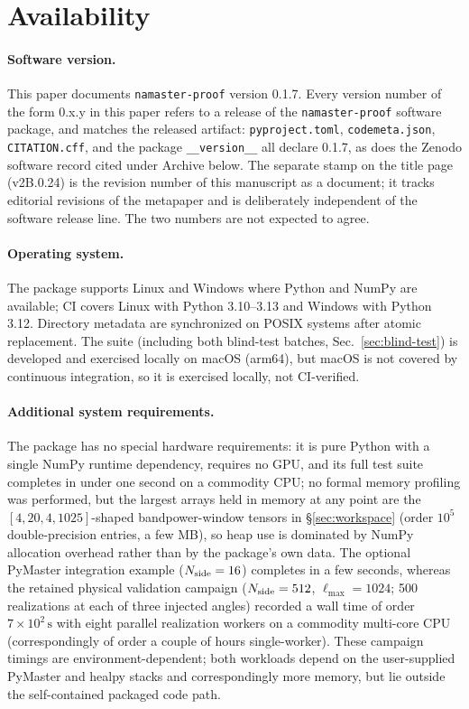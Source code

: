 \documentclass[11pt]{article}
\newcommand{\software}{\texttt{namaster-proof}}
\newcommand{\paperVersion}{v2B.0.24}
\begin{document}
\section{Availability}
\label{sec:availability}

\paragraph{Software version.}
This paper documents \software{} version 0.1.7. Every version number of the
form 0.x.y in this paper refers to a release of the \software{} software
package, and matches the released artifact: \texttt{pyproject.toml},
\texttt{codemeta.json}, \texttt{CITATION.cff}, and the package
\texttt{\_\_version\_\_} all declare 0.1.7, as does the Zenodo software record
cited under Archive below. The separate stamp on the title page
(\paperVersion) is the revision number of this manuscript as a document; it
tracks editorial revisions of the metapaper and is deliberately independent of
the software release line. The two numbers are not expected to agree.

\paragraph{Operating system.}
The package supports Linux and Windows where Python and NumPy are available;
CI covers Linux with Python 3.10--3.13 and Windows with Python 3.12. Directory
metadata are synchronized on POSIX systems after atomic replacement. The
suite (including both blind-test batches, Sec.~\ref{sec:blind-test}) is
developed and exercised locally on macOS (arm64), but macOS is not covered by
continuous integration, so it is exercised locally, not CI-verified.

\paragraph{Additional system requirements.}
The package has no special hardware requirements: it is pure Python with a
single NumPy runtime dependency, requires no GPU, and its full test suite
completes in under one second on a commodity CPU; no formal memory profiling
was performed, but the largest arrays held in memory at any point are the
\([4,20,4,1025]\)-shaped bandpower-window tensors in
\S\ref{sec:workspace} (order \(10^5\) double-precision entries, a few MB),
so heap use is dominated by NumPy allocation overhead rather than by the
package's own data. The optional PyMaster integration example (\(N_{\rm side}=16\)) completes
in a few seconds, whereas the retained physical validation campaign
(\(N_{\rm side}=512\), \(\ell_{\max}=1024\); 500 realizations at each of three
injected angles) recorded a wall time of order \(7\times10^{2}\,\mathrm{s}\)
with eight parallel realization workers on a commodity multi-core CPU
(correspondingly of order a couple of hours single-worker). These campaign
timings are environment-dependent; both workloads depend on the user-supplied
PyMaster and healpy stacks and correspondingly more memory, but lie outside the
self-contained packaged code path.
\end{document}
